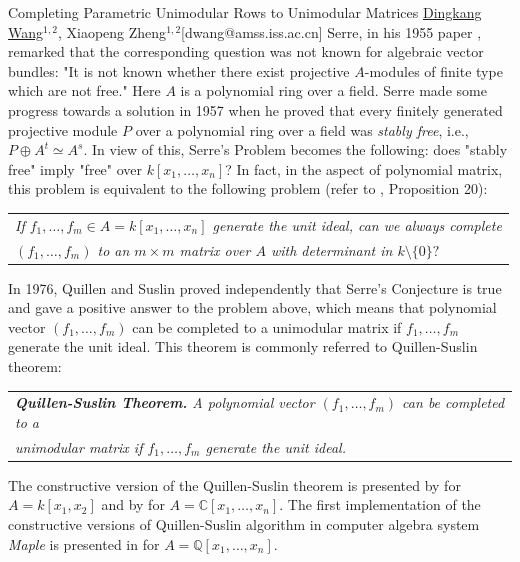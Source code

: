 \begin{abstract_online}{Completing Parametric Unimodular Rows to Unimodular Matrices}{%
        \underline{Dingkang Wang}$^{1,2}$, Xiaopeng Zheng$^{1,2}$}{[dwang@amss.iss.ac.cn]
        }
Serre, in his 1955 paper \cite{serre1955faisceaux}, remarked that the corresponding question was not known for algebraic vector bundles: "It is not known whether there exist projective $A$-modules of finite type which are not free." Here $A$ is a polynomial ring over a field. Serre made some progress towards a solution in 1957 when he proved that every finitely generated projective module $P$ over a polynomial ring over a field was {\itshape stably free}, i.e., $P \oplus A^t \simeq A^s$. In view of this, Serre's Problem becomes the following: does "stably free" imply "free" over $k[x_1,\ldots,x_n]$? In fact, in the aspect of polynomial matrix, this problem is equivalent to the following problem (refer to \cite{yengui2015constructive}, Proposition 20):  
\vspace{-0.3cm} 
\begin{center}
	\begin{tabular}{l}
		\itshape If $f_1,\ldots,f_m\in A=k[x_1,\ldots,x_n]$ generate the unit ideal, can we always complete\\ \itshape $(f_1,\ldots,f_m)$ to an $m \times m$ matrix over $A$ with determinant in $k \setminus \{0\}?$
	\end{tabular}
\end{center}
\vspace{-0.3cm} 
In 1976, Quillen \cite{quillen1976projective} and Suslin \cite{suslin1976projective} proved independently that Serre's Conjecture is true and gave a positive answer to the problem above, which means that polynomial vector $(f_1,\ldots,f_m)$ can be completed to a unimodular matrix if $f_1,\ldots,f_m$ generate the unit ideal. This theorem is commonly referred to Quillen-Suslin theorem:
\vspace{-0.3cm} 
\begin{center}
	\begin{tabular}{l}
		\itshape {\bf \itshape Quillen-Suslin Theorem.} A polynomial vector $(f_1,\ldots,f_m)$ can be completed to a \\ \itshape unimodular matrix if $f_1,\ldots,f_m$ generate the unit ideal.
	\end{tabular}
\end{center}
\vspace{-0.3cm} 

The constructive version of the Quillen-Suslin theorem is presented by \cite{roitman1975serre} for $A = k[x_1,x_2]$ and 
by \cite{logar1992algorithms} for $A = \mathbb{C}[x_1,\ldots,x_n]$. The first implementation of the constructive versions of Quillen-Suslin algorithm in computer algebra system {\itshape Maple} is presented in \cite{fabianska2007applications} for $A = \mathbb{Q}[x_1,\ldots,x_n]$. 


\end{abstract_online}
